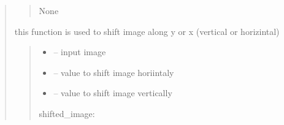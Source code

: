 \documentclass[letterpaper,10pt,english]{sphinxmanual}
\begin{document}
\begin{quote}
\begin{savenotes}
\begin{fulllineitems}
\begin{quote}
\begin{description}
\sphinxAtStartPar
None

\end{description}\end{quote}

\end{fulllineitems}\end{savenotes}


\begin{savenotes}\begin{fulllineitems}
\label{\detokenize{setting/backend/camera_funcs:oxin.backend.camera_funcs.shift_calibration_image}}
\pysigstartsignatures
{}
\pysigstopsignatures
\sphinxAtStartPar
this function is used to shift image along y or x (vertical or horizintal)
\begin{quote}\begin{description}
\begin{itemize}
\item {} 
\sphinxAtStartPar
{} – input image

\item {} 
\sphinxAtStartPar
{} – value to shift image horiintaly

\item {} 
\sphinxAtStartPar
{} – value to shift image vertically

\end{itemize}

\sphinxAtStartPar
shifted\_image:

\end{description}\end{quote}

\end{fulllineitems}\end{savenotes}



\end{quote}
\end{document}
